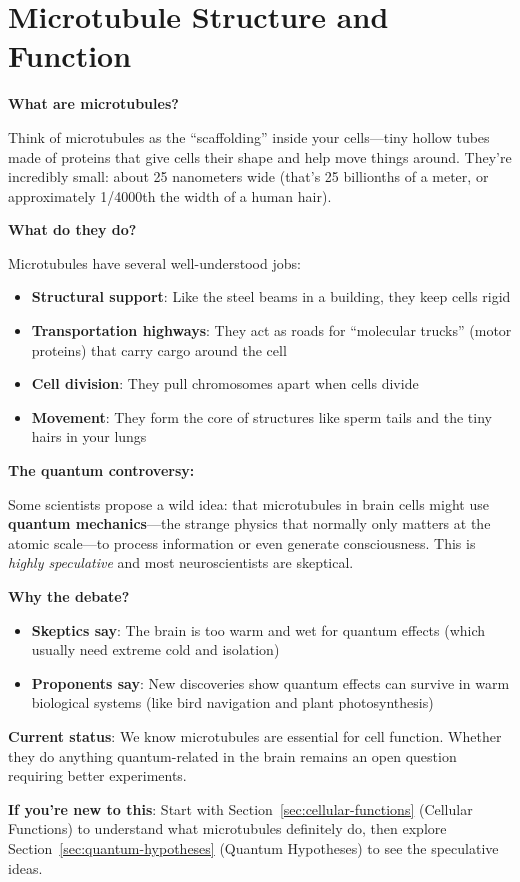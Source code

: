 \chapter{Microtubule Structure and Function}
\label{ch:microtubule-structure-function}

\begin{nontechnical}
\textbf{What are microtubules?}

Think of microtubules as the ``scaffolding'' inside your cells---tiny hollow tubes made of proteins that give cells their shape and help move things around. They're incredibly small: about 25 nanometers wide (that's 25 billionths of a meter, or approximately 1/4000th the width of a human hair).

\textbf{What do they do?}

Microtubules have several well-understood jobs:
\begin{itemize}
\item \textbf{Structural support}: Like the steel beams in a building, they keep cells rigid
\item \textbf{Transportation highways}: They act as roads for ``molecular trucks'' (motor proteins) that carry cargo around the cell
\item \textbf{Cell division}: They pull chromosomes apart when cells divide
\item \textbf{Movement}: They form the core of structures like sperm tails and the tiny hairs in your lungs
\end{itemize}

\textbf{The quantum controversy:}

Some scientists propose a wild idea: that microtubules in brain cells might use \textbf{quantum mechanics}---the strange physics that normally only matters at the atomic scale---to process information or even generate consciousness. This is \emph{highly speculative} and most neuroscientists are skeptical.

\textbf{Why the debate?}

\begin{itemize}
\item \textbf{Skeptics say}: The brain is too warm and wet for quantum effects (which usually need extreme cold and isolation)
\item \textbf{Proponents say}: New discoveries show quantum effects can survive in warm biological systems (like bird navigation and plant photosynthesis)
\end{itemize}

\textbf{Current status}: We know microtubules are essential for cell function. Whether they do anything quantum-related in the brain remains an open question requiring better experiments.

\textbf{If you're new to this}: Start with Section~\ref{sec:cellular-functions} (Cellular Functions) to understand what microtubules definitely do, then explore Section~\ref{sec:quantum-hypotheses} (Quantum Hypotheses) to see the speculative ideas.
\end{nontechnical}

